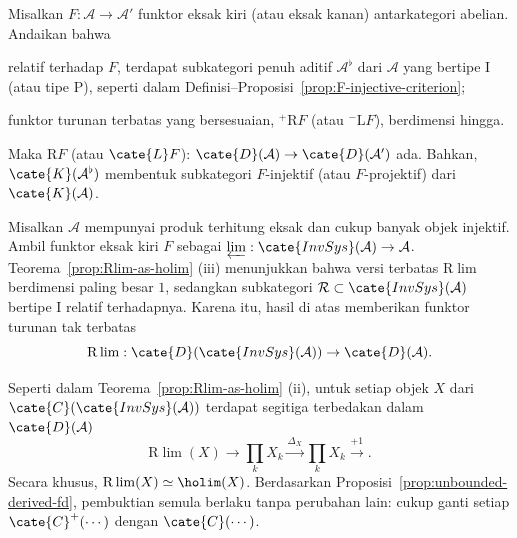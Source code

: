 \begin{proposisi}\label{prop:unbounded-derived-fd}
	Misalkan $F:\mathcal{A}\to\mathcal{A}'$ funktor eksak kiri (atau eksak
	kanan) antarkategori abelian. Andaikan bahwa
	\begin{compactitem}
		\item relatif terhadap $F$, terdapat subkategori penuh aditif
		$\mathcal{A}^\flat$ dari $\mathcal{A}$ yang bertipe I (atau tipe P),
		seperti dalam Definisi--Proposisi~\ref{prop:F-injective-criterion};
		\item funktor turunan terbatas yang bersesuaian,
		${}^+\mathrm{R}F$ (atau ${}^-\mathrm{L}F$), berdimensi hingga.
	\end{compactitem}
	Maka $\mathrm{R}F$ (atau $\cate{L}F$):
	$\cate{D}(\mathcal{A})\to\cate{D}(\mathcal{A}')$ ada. Bahkan,
	$\cate{K}(\mathcal{A}^\flat)$ membentuk subkategori $F$-injektif (atau
	$F$-projektif) dari $\cate{K}(\mathcal{A})$.
\end{proposisi}

\begin{contoh}\label{eg:Rlim-unbounded}
	Misalkan $\mathcal{A}$ mempunyai produk terhitung eksak dan cukup banyak
	objek injektif. Ambil funktor eksak kiri $F$ sebagai
	$\varprojlim:\cate{InvSys}(\mathcal{A})\to\mathcal{A}$.
	Teorema~\ref{prop:Rlim-as-holim} (iii) menunjukkan bahwa versi terbatas
	$\mathrm{R}\lim$ berdimensi paling besar $1$, sedangkan subkategori
	$\mathcal{R}\subset\cate{InvSys}(\mathcal{A})$ bertipe I relatif
	terhadapnya. Karena itu, hasil di atas memberikan funktor turunan tak terbatas
	\[ \mathrm{R}\lim: \cate{D}(\cate{InvSys}(\mathcal{A})) \to \cate{D}(\mathcal{A}). \]

	Seperti dalam Teorema~\ref{prop:Rlim-as-holim} (ii), untuk setiap objek $X$
	dari $\cate{C}(\cate{InvSys}(\mathcal{A}))$ terdapat segitiga terbedakan
	dalam $\cate{D}(\mathcal{A})$
	\[ \mathrm{R}\lim(X) \to \prod_k X_k \xrightarrow{\Delta_X} \prod_k X_k \xrightarrow{+1} . \]
	Secara khusus, $\mathrm{R}\lim(X)\simeq\holim(X)$. Berdasarkan
	Proposisi~\ref{prop:unbounded-derived-fd}, pembuktian semula berlaku tanpa
	perubahan lain: cukup ganti setiap $\cate{C}^+(\cdots)$ dengan
	$\cate{C}(\cdots)$.
\end{contoh}
